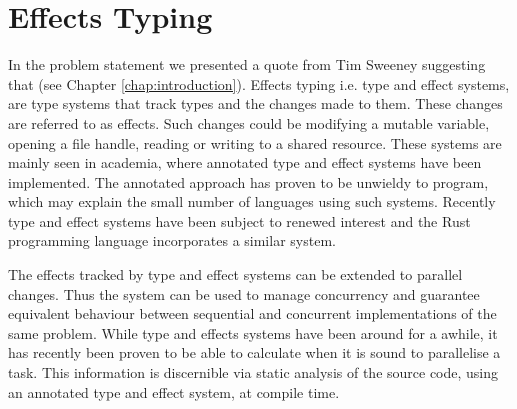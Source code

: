 \section{Effects Typing}
In the problem statement we presented a quote from Tim Sweeney suggesting that  (see Chapter \ref{chap:introduction}). Effects typing i.e. type and effect systems, are type systems that track types and the changes made to them\cite{nielson1999type}. These changes are referred to as effects. Such changes could be modifying a mutable variable, opening a file handle, reading or writing to a shared resource. These systems are mainly seen in academia, where annotated type and effect systems have been implemented. The annotated approach has proven to be unwieldy to program\cite{toro2015customizable}, which may explain the small number of languages using such systems. Recently type and effect systems have been subject to renewed interest and the Rust programming language incorporates a similar system\cite{rust:lang}.

The effects tracked by type and effect systems can be extended to parallel changes. Thus the system can be used to manage concurrency and guarantee equivalent behaviour between sequential and concurrent implementations of the same problem\cite{krogh2017relational}. While type and effects systems have been around for a awhile, it has recently been proven to be able to calculate when it is sound to parallelise a task\cite{birkedal2012concurrent}. This information is discernible via static analysis of the source code, using an annotated type and effect system, at compile time.
